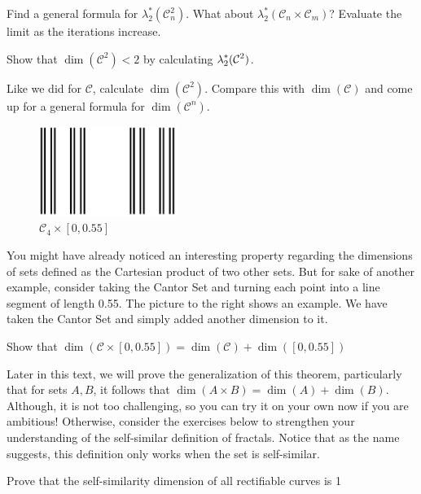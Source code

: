 \begin{exercise}
    Find a general formula for $\lambda^*_2(\mathcal{C}^2_n)$. What about $\lambda^*_2(\mathcal{C}_n\times \mathcal{C}_m)$? Evaluate the limit as the iterations increase.
\end{exercise}

\begin{exercise}
    Show that $\dim(\mathcal{C}^2)<2$ by calculating $\displaystyle \lambda^*_2(\mathcal{C}^2)$.  
\end{exercise}

\begin{exercise}
    Like we did for $\mathcal{C}$, calculate $\dim(\mathcal{C}^2)$. Compare this with $\dim(\mathcal{C})$ and come up for a general formula for $\dim(\mathcal{C}^n)$. 
\end{exercise}

\begin{figure}
  \begin{center}
    \includegraphics[width=0.4\textwidth]{Images/1.4.5.png}
  \end{center}
  \caption{$\mathcal{C}_4\times [0,0.55]$}
\end{figure}


You might have already noticed an interesting property regarding the dimensions of sets defined as the Cartesian product of two other sets. But for sake of another example, consider taking the Cantor Set and turning each point into a line segment of length 0.55. The picture to the right shows an example. We have taken the Cantor Set and simply added another dimension to it. 

\clearpage

\begin{exercise}
    Show that $\dim\left(\mathcal{C}\times [0,0.55]\right) = \dim(\mathcal{C})+\dim([0,0.55])$
\end{exercise}

Later in this text, we will prove the generalization of this theorem, particularly that for sets $A,B$, it follows that $\dim(A\times B)=\dim(A)+\dim(B)$. Although, it is not too challenging, so you can try it on your own now if you are ambitious! Otherwise, consider the exercises below to strengthen your understanding of the self-similar definition of fractals. Notice that as the name suggests, this definition only works when the set is self-similar. 

\begin{exercise}
    
\end{exercise}

\begin{exercise}
    
\end{exercise}

\begin{exercise}
    Prove that the self-similarity dimension of all rectifiable curves is 1
\end{exercise}